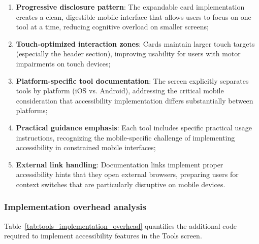 \begin{enumerate}
    \item \textbf{Progressive disclosure pattern}: The expandable card implementation creates a clean, digestible mobile interface that allows users to focus on one tool at a time, reducing cognitive overload on smaller screens;
    
    \item \textbf{Touch-optimized interaction zones}: Cards maintain larger touch targets (especially the header section), improving usability for users with motor impairments on touch devices;
    
    \item \textbf{Platform-specific tool documentation}: The screen explicitly separates tools by platform (iOS vs. Android), addressing the critical mobile consideration that accessibility implementation differs substantially between platforms;
    
    \item \textbf{Practical guidance emphasis}: Each tool includes specific practical usage instructions, recognizing the mobile-specific challenge of implementing accessibility in constrained mobile interfaces;
    
    \item \textbf{External link handling}: Documentation links implement proper accessibility hints that they open external browsers, preparing users for context switches that are particularly disruptive on mobile devices.
\end{enumerate}

\subsubsection{Implementation overhead analysis}

Table~\ref{tab:tools_implementation_overhead} quantifies the additional code required to implement accessibility features in the Tools screen.

